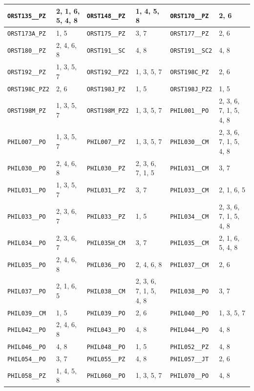 \begin{longtable}{|l|l||l|l||l|l|}
    \verb|ORST135__PZ| & 2, 1, 6, 5, 4, 8 & \verb|ORST148__PZ| & 1, 4, 5, 8 & \verb|ORST170__PZ| & 2, 6\\\hline
    \verb|ORST173A_PZ| & 1, 5 & \verb|ORST175__PZ| & 3, 7 & \verb|ORST177__PZ| & 2, 6\\\hline
    \verb|ORST180__PZ| & 2, 4, 6, 8 & \verb|ORST191__SC| & 4, 8 & \verb|ORST191__SC2| & 4, 8\\\hline
    \verb|ORST192__PZ| & 1, 3, 5, 7 & \verb|ORST192__PZ2| & 1, 3, 5, 7 & \verb|ORST198C_PZ| & 2, 6\\\hline
    \verb|ORST198C_PZ2| & 2, 6 & \verb|ORST198J_PZ| & 1, 5 & \verb|ORST198J_PZ2| & 1, 5\\\hline
    \verb|ORST198M_PZ| & 1, 3, 5, 7 & \verb|ORST198M_PZ2| & 1, 3, 5, 7 & \verb|PHIL001__PO| & 2, 3, 6, 7, 1, 5, 4, 8\\\hline
    \verb|PHIL007__PO| & 1, 3, 5, 7 & \verb|PHIL007__PZ| & 1, 3, 5, 7 & \verb|PHIL030__CM| & 2, 3, 6, 7, 1, 5, 4, 8\\\hline
    \verb|PHIL030__PO| & 2, 4, 6, 8 & \verb|PHIL030__PZ| & 2, 3, 6, 7, 1, 5 & \verb|PHIL031__CM| & 3, 7\\\hline
    \verb|PHIL031__PO| & 1, 3, 5, 7 & \verb|PHIL031__PZ| & 3, 7 & \verb|PHIL033__CM| & 2, 1, 6, 5\\\hline
    \verb|PHIL033__PO| & 2, 3, 6, 7 & \verb|PHIL033__PZ| & 1, 5 & \verb|PHIL034__CM| & 2, 3, 6, 7, 1, 5, 4, 8\\\hline
    \verb|PHIL034__PO| & 2, 3, 6, 7 & \verb|PHIL035H_CM| & 3, 7 & \verb|PHIL035__CM| & 2, 1, 6, 5, 4, 8\\\hline
    \verb|PHIL035__PO| & 2, 4, 6, 8 & \verb|PHIL036__PO| & 2, 4, 6, 8 & \verb|PHIL037__CM| & 2, 6\\\hline
    \verb|PHIL037__PO| & 2, 1, 6, 5 & \verb|PHIL038__CM| & 2, 3, 6, 7, 1, 5, 4, 8 & \verb|PHIL038__PO| & 3, 7\\\hline
    \verb|PHIL039__CM| & 1, 5 & \verb|PHIL039__PO| & 2, 6 & \verb|PHIL040__PO| & 1, 3, 5, 7\\\hline
    \verb|PHIL042__PO| & 2, 4, 6, 8 & \verb|PHIL043__PO| & 4, 8 & \verb|PHIL044__PO| & 4, 8\\\hline
    \verb|PHIL046__PO| & 4, 8 & \verb|PHIL048__PO| & 1, 5 & \verb|PHIL052__PZ| & 4, 8\\\hline
    \verb|PHIL054__PO| & 3, 7 & \verb|PHIL055__PZ| & 4, 8 & \verb|PHIL057__JT| & 2, 6\\\hline
    \verb|PHIL058__PZ| & 1, 4, 5, 8 & \verb|PHIL060__PO| & 1, 3, 5, 7 & \verb|PHIL070__PO| & 4, 8\\\hline

\end{longtable}
